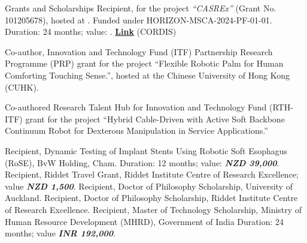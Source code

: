 \begin{rubric}{Grants and Scholarships}
        \entry*[2025] Recipient,  for the project \textit{``CASREx''} (Grant No. 101205678), hosted at . Funded under HORIZON-MSCA-2024-PF-01-01. Duration: 24 months; value: .
        \href{https://cordis.europa.eu/project/id/101205678}{\textbf{\textbf{Link}}} (CORDIS)
        
        \entry*[2023] Co-author, Innovation and Technology Fund (ITF) Partnership Research Programme (PRP) grant for the project “Flexible Robotic Palm for Human Comforting Touching Sense.”, hosted at the Chinese University of Hong Kong (CUHK).

         
        \entry*[2022] Co-authored Research Talent Hub for Innovation and Technology Fund (RTH-ITF) grant for the project “Hybrid Cable-Driven with Active Soft Backbone Continuum Robot for Dexterous Manipulation in Service Applications.”


        
        \entry*[2018] Recipient, Dynamic Testing of Implant Stents Using Robotic Soft Esophagus (RoSE), BvW Holding, Cham. Duration: 12 months; value: \textbf{\textit{NZD 39,000}}.
        \entry*[2018, 2019] Recipient, Riddet Travel Grant, Riddet Institute Centre of Research Excellence; value \textit{\textbf{NZD 1,500}}.
        \entry*[2019--2020] Recipient, Doctor of Philosophy Scholarship, University of Auckland.
        \entry*[2016--2019] Recipient, Doctor of Philosophy Scholarship, Riddet Institute Centre of Research Excellence.
        \entry*[2011--2013] Recipient, Master of Technology Scholarship, Ministry of Human Resource Development (MHRD), Government of India Duration: 24 months; value \textit{\textbf{INR 192,000}}.
\end{rubric}